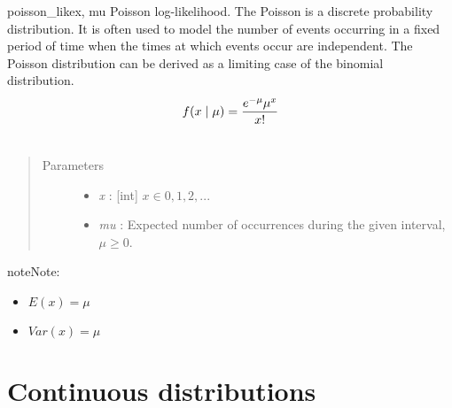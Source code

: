 \hypertarget{pymc.distributions.poisson_like}{}\begin{funcdesc}{poisson\_like}{x, mu}
Poisson log-likelihood. The Poisson is a discrete probability distribution.
It is often used to model the number of events occurring in a fixed period of
time when the times at which events occur are independent. The Poisson
distribution can be derived as a limiting case of the binomial distribution.
\begin{gather}
\begin{split}f(x \mid \mu) = \frac{e^{-\mu}\mu^x}{x!}\end{split}\notag\\\begin{split}\end{split}\notag
\end{gather}\begin{quote}\begin{description}
\item[Parameters] \leavevmode\begin{itemize}
\item {} 
\emph{x} : {[}int{]} $x \in {0,1,2,...}$

\item {} 
\emph{mu} : Expected number of occurrences during the given interval, $\mu \geq 0$.

\end{itemize}

\end{description}\end{quote}

\begin{notice}{note}{Note:}\begin{itemize}
\item {} 
$E(x)=\mu$

\item {} 
$Var(x)=\mu$

\end{itemize}
\end{notice}
\end{funcdesc}


\section{Continuous distributions}

